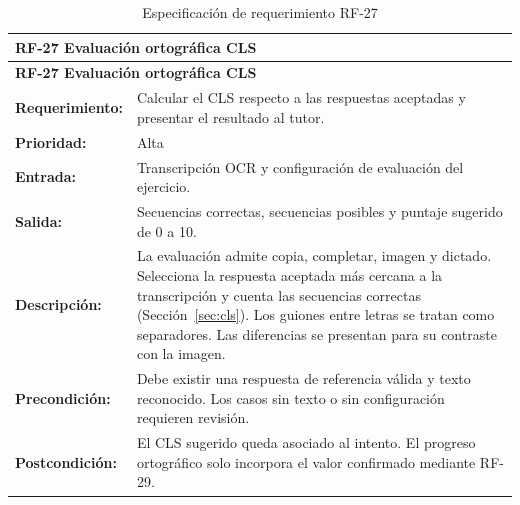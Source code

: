 \begin{longtable}{|p{3.2cm}|p{11.8cm}|}
\caption{Especificación de requerimiento RF-27}\label{tab:rf27} \\ \hline
\multicolumn{2}{|p{15cm}|}{\textbf{RF-27 Evaluación ortográfica CLS}} \\ \hline
\endfirsthead
\hline
\multicolumn{2}{|p{15cm}|}{\textbf{RF-27 Evaluación ortográfica CLS}} \\ \hline
\endhead
\textbf{Requerimiento:} & Calcular el CLS respecto a las respuestas aceptadas y presentar el resultado al tutor. \\ \hline
\textbf{Prioridad:} & Alta \\ \hline
\textbf{Entrada:} & Transcripción OCR y configuración de evaluación del ejercicio. \\ \hline
\textbf{Salida:} & Secuencias correctas, secuencias posibles y puntaje sugerido de 0 a 10. \\ \hline
\textbf{Descripción:} & La evaluación admite copia, completar, imagen y dictado. Selecciona la respuesta aceptada más cercana a la transcripción y cuenta las secuencias correctas (Sección~\ref{sec:cls}). Los guiones entre letras se tratan como separadores. Las diferencias se presentan para su contraste con la imagen. \\ \hline
\textbf{Precondición:} & Debe existir una respuesta de referencia válida y texto reconocido. Los casos sin texto o sin configuración requieren revisión. \\ \hline
\textbf{Postcondición:} & El CLS sugerido queda asociado al intento. El progreso ortográfico solo incorpora el valor confirmado mediante RF-29. \\ \hline
\end{longtable}


